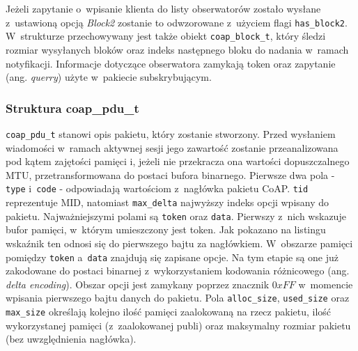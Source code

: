 Jeżeli zapytanie o~wpisanie klienta do listy obserwatorów zostało wysłane z~ustawioną opcją \textit{Block2} zostanie to odwzorowane z~użyciem flagi \verb|has_block2|. W~strukturze przechowywany jest także obiekt \verb|coap_block_t|, który śledzi rozmiar wysyłanych bloków oraz indeks następnego bloku do nadania w~ramach notyfikacji. Informacje dotyczące obserwatora zamykają token oraz zapytanie (ang. \textit{querry}) użyte w~pakiecie subskrybującym.\\



\subsubsection{Struktura coap\_pdu\_t}

\vspace{0.5cm}

\vspace{0.5cm}

\verb|coap_pdu_t| stanowi opis pakietu, który zostanie stworzony. Przed wysłaniem wiadomości w~ramach aktywnej sesji jego zawartość zostanie przeanalizowana pod kątem zajętości pamięci i, jeżeli nie przekracza ona wartości dopuszczalnego MTU, przetransformowana do postaci bufora binarnego. Pierwsze dwa pola - \verb|type| i~\verb|code| - odpowiadają wartościom z~nagłówka pakietu CoAP. \verb|tid| reprezentuje MID, natomiast \verb|max_delta| najwyższy indeks opcji wpisany do pakietu. Najważniejszymi polami są \verb|token| oraz \verb|data|. Pierwszy z~nich wskazuje bufor pamięci, w~którym umieszczony jest token. Jak pokazano na listingu wskaźnik ten odnosi się do pierwszego bajtu za nagłówkiem. W~obszarze pamięci pomiędzy \verb|token| a~\verb|data| znajdują się zapisane opcje. Na tym etapie są one już zakodowane do postaci binarnej z~wykorzystaniem kodowania różnicowego (ang. \textit{delta encoding}). Obszar opcji jest zamykany poprzez znacznik $0xFF$ w~momencie wpisania pierwszego bajtu danych do pakietu. Pola \verb|alloc_size|, \verb|used_size| oraz \verb|max_size| określają kolejno ilość pamięci zaalokowaną na rzecz pakietu, ilość wykorzystanej pamięci (z~zaalokowanej publi) oraz maksymalny rozmiar pakietu (bez uwzględnienia nagłówka). \\





